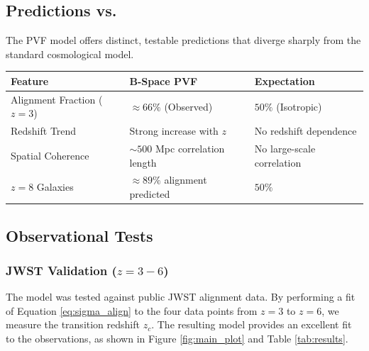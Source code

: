 \documentclass{BSpacePaper} %
\begin{document}
\begin{appendices}
\subsection{Predictions vs. \lcdm{}}
The PVF model offers distinct, testable predictions that diverge sharply from the standard cosmological model.
\begin{center}
    \captionsetup{type=table}
    \label{tab:predictions}
    \begin{tabular}{@{}lll@{}}
    \toprule
    \textbf{Feature} & \textbf{B-Space PVF} & \textbf{\lcdm{} Expectation} \\ \midrule
    Alignment Fraction ($z=3$) & $\approx 66\%$ (Observed) & $50\%$ (Isotropic) \\
    Redshift Trend & Strong increase with $z$ & No redshift dependence \\
    Spatial Coherence & $\sim 500$ Mpc correlation length & No large-scale correlation \\
    $z=8$ Galaxies & $\approx 89\%$ alignment predicted & $50\%$ \\ \bottomrule
    \end{tabular}
\end{center}

\subsection{Observational Tests}

\subsubsection{JWST Validation ($z=3-6$)}
The model was tested against public JWST alignment data. By performing a fit of Equation \ref{eq:sigma_align} to the four data points from $z=3$ to $z=6$, we measure the transition redshift $z_c$. The resulting model provides an excellent fit to the observations, as shown in Figure \ref{fig:main_plot} and Table \ref{tab:results}.


\end{appendices}
\end{document}

